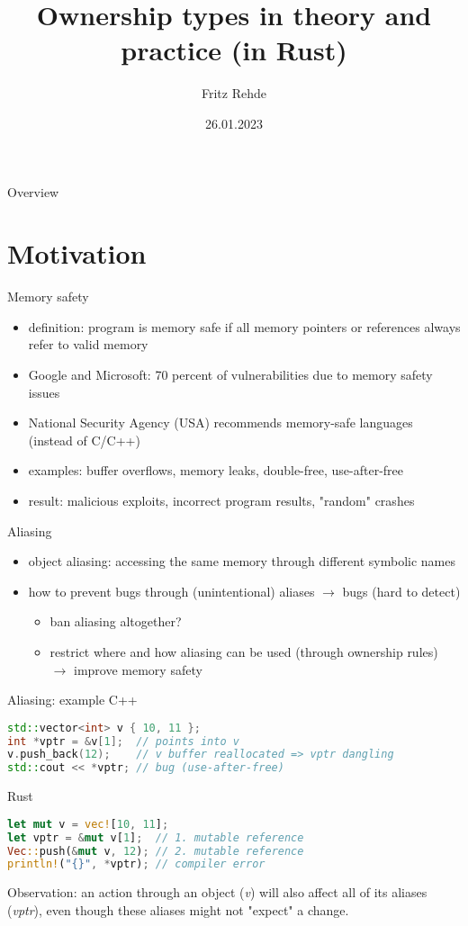\documentclass{beamer}
\title{Ownership types in theory and practice (in Rust)}
\author{Fritz Rehde}
\institute{School of Computation, Information, and Technology\\Technical University of Munich}
\date{26.01.2023}
\begin{document}
\frame{\titlepage}

\begin{frame}{Overview}
\tableofcontents
\end{frame}

\section{Motivation}

\begin{frame}{Memory safety}
\begin{itemize}
  \item definition: program is memory safe if all memory pointers or references always refer to valid memory
  \item Google and Microsoft: 70 percent of vulnerabilities due to memory safety issues
  \item National Security Agency (USA) recommends memory-safe languages (instead of C/C++)
  \item examples: buffer overflows, memory leaks, double-free, use-after-free
  \item result: malicious exploits, incorrect program results, "random" crashes
\end{itemize}
\end{frame}


\begin{frame}{Aliasing}
\begin{itemize}
  \item object aliasing: accessing the same memory through different symbolic names
  \item how to prevent bugs through (unintentional) aliases $\rightarrow$ bugs (hard to detect)
  \begin{itemize}
    \item ban aliasing altogether?
    \item restrict where and how aliasing can be used (through ownership rules) $\rightarrow$ improve memory safety
  \end{itemize}
\end{itemize}
\end{frame}


\begin{frame}[fragile]{Aliasing: example}
C++
\begin{lstlisting}[language=C++]
std::vector<int> v { 10, 11 };
int *vptr = &v[1];  // points into v
v.push_back(12);    // v buffer reallocated => vptr dangling
std::cout << *vptr; // bug (use-after-free)
\end{lstlisting}

Rust
\begin{lstlisting}[language=Rust]
let mut v = vec![10, 11];
let vptr = &mut v[1];  // 1. mutable reference
Vec::push(&mut v, 12); // 2. mutable reference
println!("{}", *vptr); // compiler error
\end{lstlisting}

Observation: an action through an object (\emph{v}) will also affect all of its aliases (\emph{vptr}), even though these aliases might not "expect" a change.
\end{frame}
\end{document}
